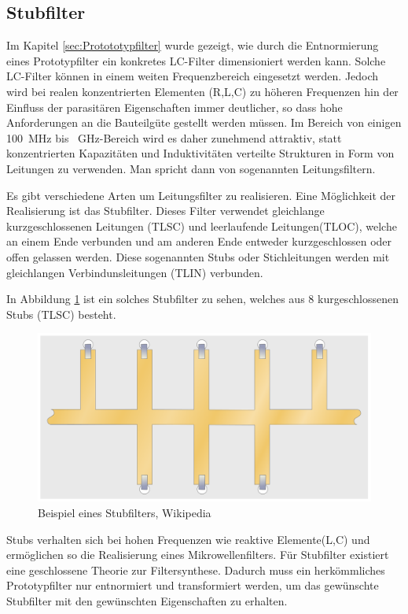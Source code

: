 \subsection{Stubfilter}

Im  Kapitel   \ref{sec:Protototypfilter}   wurde   gezeigt,   wie   durch  die
Entnormierung  eines  Prototypfilter  ein  konkretes  LC-Filter  dimensioniert
werden  kann.  Solche  LC-Filter  können   in   einem  weiten  Frequenzbereich
eingesetzt werden.  Jedoch wird bei realen konzentrierten Elementen (R,L,C) zu
höheren  Frequenzen hin  der  Einfluss  der  parasitären  Eigenschaften  immer
deutlicher, so dass  hohe  Anforderungen  an  die  Bauteilgüte gestellt werden
müssen.     Im    Bereich    von     einigen     \SI{100}{\mega\hertz}     bis
\SI{}{\giga\hertz}-Bereich   wird   es   daher   zunehmend  attraktiv,   statt
konzentrierten Kapazitäten und Induktivitäten verteilte Strukturen in Form von
Leitungen  zu  verwenden.\cite[p.~203]{ref:gustrau}   Man   spricht  dann  von
sogenannten Leitungsfiltern.

Es gibt  verschiedene Arten um Leitungsfilter zu realisieren. Eine Möglichkeit
der Realisierung  ist  das  Stubfilter.  Dieses  Filter  verwendet gleichlange
kurzgeschlossenen Leitungen (TLSC) und leerlaufende Leitungen(TLOC), welche an
einem   Ende   verbunden  und  am  anderen   Ende   entweder   kurzgeschlossen
oder offen gelassen werden. Diese sogenannten Stubs oder Stichleitungen werden
mit gleichlangen Verbindunsleitungen (TLIN) verbunden.

In  Abbildung \ref{fig:Stubfilter} ist ein solches Stubfilter zu sehen, welches aus
8 kurgeschlossenen Stubs (TLSC) besteht.

\begin{figure}[h!]
\centering
 	\includegraphics[width=\imagewidth]{images/Stripline_Stub_Filter}
 	\caption{Beispiel eines Stubfilters, Wikipedia \cite{ref:wikipedia:stripline}}
 	\label{fig:Stubfilter}
\end{figure}

Stubs  verhalten sich bei hohen  Frequenzen  wie  reaktive  Elemente(L,C)  und
ermöglichen  so  die  Realisierung  eines  Mikrowellenfilters.  Für Stubfilter
existiert eine  geschlossene  Theorie  zur  Filtersynthese.  Dadurch  muss ein
herkömmliches Prototypfilter nur entnormiert  und transformiert werden, um das
gewünschte  Stubfilter  mit   den   gewünschten   Eigenschaften  zu  erhalten.


